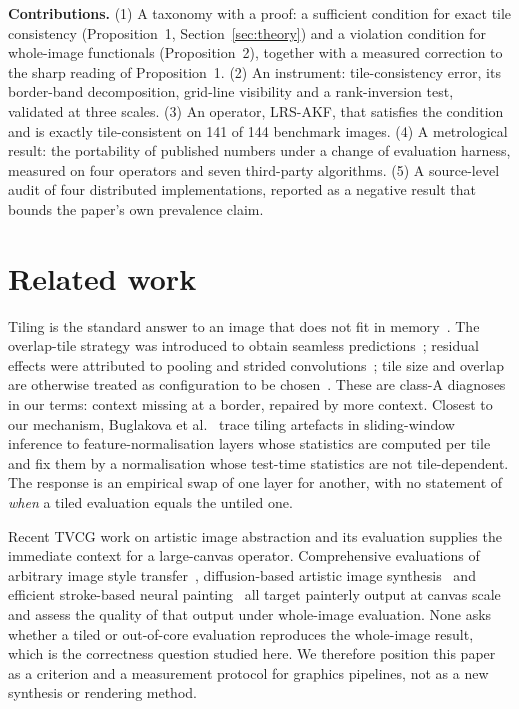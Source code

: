 \documentclass[journal]{IEEEtran}
\begin{document}
\textbf{Contributions.} (1) A taxonomy with a proof: a sufficient condition for exact tile consistency (Proposition~1, Section~\ref{sec:theory}) and a violation condition for whole-image functionals (Proposition~2), together with a measured correction to the sharp reading of Proposition~1. (2) An instrument: tile-consistency error, its border-band decomposition, grid-line visibility and a rank-inversion test, validated at three scales. (3) An operator, LRS-AKF, that satisfies the condition and is exactly tile-consistent on 141 of 144 benchmark images. (4) A metrological result: the portability of published numbers under a change of evaluation harness, measured on four operators and seven third-party algorithms. (5) A source-level audit of four distributed implementations, reported as a negative result that bounds the paper's own prevalence claim.

\section{Related work}\label{sec:related}

Tiling is the standard answer to an image that does not fit in memory~\cite{dash2022gigapixel,powell2010gigapixel}. The overlap-tile strategy was introduced to obtain seamless predictions~\cite{ronneberger2015unet}; residual effects were attributed to pooling and strided convolutions~\cite{reina2020tiling,huang2018tiling}; tile size and overlap are otherwise treated as configuration to be chosen~\cite{cira2024tile,mihajlovic2025sahi,akyon2022sahi}. These are class-A diagnoses in our terms: context missing at a border, repaired by more context. Closest to our mechanism, Buglakova et al.~\cite{buglakova2025tiling} trace tiling artefacts in sliding-window inference to feature-normalisation layers whose statistics are computed per tile and fix them by a normalisation whose test-time statistics are not tile-dependent. The response is an empirical swap of one layer for another, with no statement of \emph{when} a tiled evaluation equals the untiled one.

Recent TVCG work on artistic image abstraction and its evaluation supplies the immediate context for a large-canvas operator. Comprehensive evaluations of arbitrary image style transfer~\cite{zhou2025wise}, diffusion-based artistic image synthesis~\cite{huang2025creativesynth} and efficient stroke-based neural painting~\cite{tang2025attentionpainter} all target painterly output at canvas scale and assess the quality of that output under whole-image evaluation. None asks whether a tiled or out-of-core evaluation reproduces the whole-image result, which is the correctness question studied here. We therefore position this paper as a criterion and a measurement protocol for graphics pipelines, not as a new synthesis or rendering method.
\end{document}
